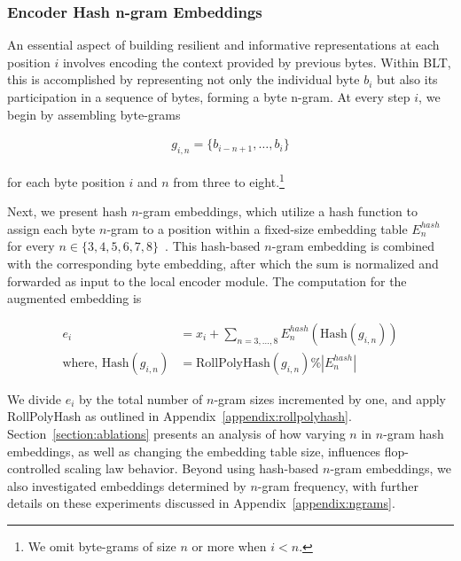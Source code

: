 \subsubsection{Encoder Hash n-gram Embeddings}
\label{sec:ngram-emb}
\label{sec:hash-emb}
An essential aspect of building resilient and informative representations at each position $i$ involves encoding the context provided by previous bytes. Within {\textsc BLT}, this is accomplished by representing not only the individual byte $b_i$ but also its participation in a sequence of bytes, forming a byte n-gram. At every step $i$, we begin by assembling byte-grams

\begin{align}
    g_{i,n}=\{b_{i-n + 1},\ldots, b_i\}
\end{align}

for each byte position $i$ and $n$ from three to eight.\footnote{
We omit byte-grams of size $n$ or more when $i<n$. }

Next, we present hash $n$-gram embeddings, which utilize a hash function to assign each byte $n$-gram to a position within a fixed-size embedding table $E_{n}^{hash}$ for every $n \in\{3,4,5,6,7,8\}$~\citep{bai2010learning}. This hash-based $n$-gram embedding is combined with the corresponding byte embedding, after which the sum is normalized and forwarded as input to the local encoder module. The computation for the augmented embedding is

\begin{align}
e_i &= x_i + \sum_{n = 3,...,8}E_{n}^{hash}(\text{Hash}(g_{i,n})) \\
\text{where, Hash}(g_{i,n}) &= \text{RollPolyHash}(g_{i,n}) \% |E_{n}^{hash}|
\end{align}

We divide $e_i$ by the total number of $n$-gram sizes incremented by one, and apply RollPolyHash as outlined in Appendix~\ref{appendix:rollpolyhash}. Section~\ref{section:ablations} presents an analysis of how varying $n$ in $n$-gram hash embeddings, as well as changing the embedding table size, influences flop-controlled scaling law behavior. Beyond using hash-based $n$-gram embeddings, we also investigated embeddings determined by $n$-gram frequency, with further details on these experiments discussed in Appendix~\ref{appendix:ngrams}.

